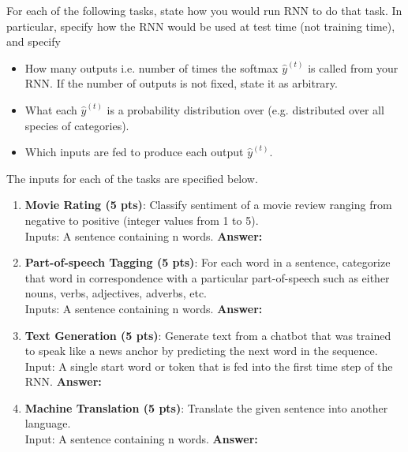 \documentclass{assignment format}
\newenvironment{answer}{
    {\bf Answer:} \begingroup\color{red}
}{\endgroup}%
\begin{document}
For each of the following tasks, state how you would run RNN to do that task. In particular, specify how the RNN would be used at test time (not training time), and specify
\begin{itemize}
    \item How many outputs i.e. number of times the softmax $\hat{y}^{(t)}$ is called from your RNN. If the number of outputs is not fixed, state it as arbitrary.  
    \item What each $\hat{y}^{(t)}$ is a probability distribution over (e.g. distributed over all species of categories).
    \item Which inputs are fed to produce each output $\hat{y}^{(t)}$.
    \end{itemize}
The inputs for each of the tasks are specified below.
\begin{enumerate}[label=(\alph*)]
    \item \textbf{Movie Rating (5 pts)}: Classify sentiment of a movie review ranging from negative to positive (integer values from 1 to 5).\\Inputs: A sentence containing n words.
    \begin{answer}
    \end{answer}
    \item \textbf{Part-of-speech Tagging (5 pts)}: For each word in a sentence, categorize that word in correspondence with a particular part-of-speech such as either nouns, verbs, adjectives, adverbs, etc.\\Inputs: A sentence containing n words.
    \begin{answer}
    \end{answer}
    \item \textbf{Text Generation (5 pts)}: Generate text from a chatbot that was trained to speak like a news anchor by predicting the next word in the sequence. \\Input: A single start word or token that is fed into the first time step of the RNN.
    \begin{answer}
    \end{answer}
    \item \textbf{Machine Translation (5 pts)}: Translate the given sentence into another language. \\Input: A sentence containing n words. 
    \begin{answer}
    \end{answer}
    \end{enumerate}
    
\end{document}
